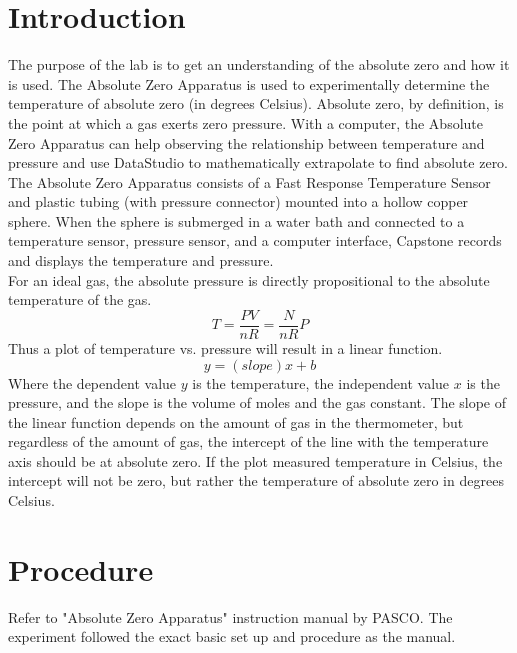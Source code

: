\documentclass[11pt]{article}
\begin{document}
\section*{Introduction}
The purpose of the lab is to get an understanding of the absolute zero and how it is used. The Absolute Zero Apparatus is used to experimentally determine the temperature of absolute zero (in degrees Celsius). Absolute zero, by definition, is the point at which a gas exerts zero pressure. With a computer, the Absolute Zero Apparatus can help observing the relationship between temperature and pressure and use DataStudio to mathematically extrapolate to find absolute zero.\\
The Absolute Zero Apparatus consists of a Fast Response Temperature Sensor and plastic tubing (with pressure connector) mounted into a hollow copper sphere. When the sphere is submerged in a water bath and connected to a temperature sensor, pressure sensor, and a computer interface, Capstone records and displays the temperature and pressure.\\
For an ideal gas, the absolute pressure is directly propositional to the absolute temperature of the gas.
\begin{equation}
    T=\frac{PV}{nR}=\frac{N}{nR}P
\end{equation}
Thus a plot of temperature vs. pressure will result in a linear function.
\begin{equation}
    y=(slope)x+b
\end{equation}
Where the dependent value $y$ is the temperature, the independent value $x$ is the pressure, and the slope is the volume of moles and the gas constant. The slope of the linear function depends on the amount of gas in the thermometer, but regardless of the amount of gas, the intercept of the line with the temperature axis should be at absolute zero. If the plot measured temperature in Celsius, the intercept will not be zero, but rather the temperature of absolute zero in degrees Celsius.

\section*{Procedure}
Refer to "Absolute Zero Apparatus" instruction manual by PASCO. The experiment followed the exact basic set up and procedure as the manual. 
\end{document}
